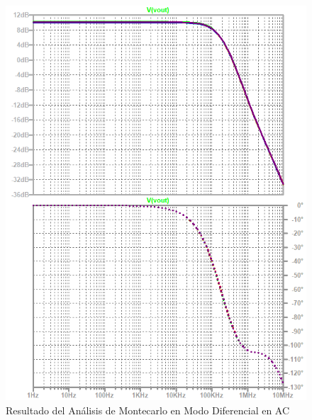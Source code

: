 \begin{figure}[ht]
\begin{center}
\includegraphics[scale=1]{res/spice/spice_dm_ac_bode_mc.png}
\caption{Resultado del Análisis de Montecarlo en Modo Diferencial en AC}
\label{e4:fig_spice_dm_ac_mc}
\end{center}
\end{figure}